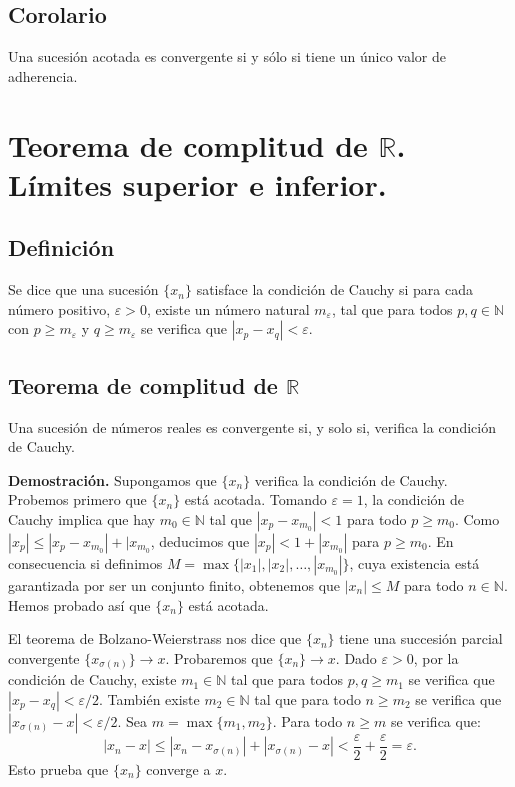 \documentclass[10pt,a4paper]{article}
\begin{document}
	\subsection{Corolario}
	
	Una sucesión acotada es convergente si y sólo si tiene un único valor de adherencia.
	
	\newpage
	
	\section{Teorema de complitud de $\mathbb{R}$. Límites superior e inferior.}
	
	\subsection{Definición}
	
	Se dice que una sucesión $\{x_n\}$ satisface la condición de Cauchy si para cada número positivo, $\varepsilon > 0$, existe un número natural $m_\varepsilon$, tal que para todos $p, q \in \mathbb{N}$ con $p \geq m_\varepsilon$ y $q \geq m_\varepsilon$ se verifica que $|x_p - x_q| < \varepsilon$.
	
	\subsection{Teorema de complitud de $\mathbb{R}$}
	Una sucesión de números reales es convergente si, y solo si, verifica la condición de Cauchy.
	
	\textbf{Demostración. }Supongamos que $\{x_n\}$ verifica la condición de Cauchy. Probemos primero que $\{x_n\}$ está acotada. Tomando $\varepsilon = 1$, la condición de Cauchy implica que hay $m_0 \in \mathbb{N}$ tal que $|x_p - x_{m_0} | < 1$ para todo $p \geq m_0$. Como $|x_p| \leq |x_p - x_{m_0} | + |x_{m_0}$, deducimos que $|x_p| < 1+|x_{m_0}|$ para $p \geq m_0$. En consecuencia si definimos $M = \max\{|x_1|, |x_2|, \dots, |x_{m_0}|\}$, cuya existencia está garantizada por ser un conjunto finito, obtenemos que $|x_n| \leq M$ para todo $ n\in \mathbb{N}$. Hemos probado así que $\{x_n\}$ está acotada.
	
	El teorema de Bolzano-Weierstrass nos dice que $\{x_n\}$ tiene una succesión parcial convergente $\{x_{\sigma(n)}\} \rightarrow x$. Probaremos que $\{x_n\} \rightarrow x$. Dado $\varepsilon > 0$, por la condición de Cauchy, existe $m_1 \in \mathbb{N}$ tal que para todos $p, q \geq m_1$ se verifica que $ |x_p - x_q| < \varepsilon/2$. También existe $m_2 \in \mathbb{N}$ tal que para todo $n \geq m_2$ se verifica que $|x_{\sigma(n)} - x| < \varepsilon/2$. Sea $m = \max\{m_1, m_2\}$. Para todo $n \geq m$ se verifica que:
	$$|x_n - x| \leq |x_n - x_{\sigma(n)}|+ |x_{\sigma(n)} - x| < \dfrac{\varepsilon}{2} + \dfrac{\varepsilon}{2} = \varepsilon.$$
	Esto prueba que $\{x_n\}$ converge a $x$.
	
\end{document}
